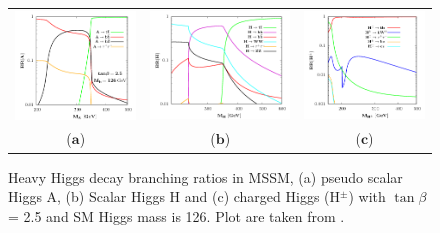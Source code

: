 \begin{figure}[htp]
\centering
\begin{tabular}{ccc}
\hspace{-0.7cm}
\includegraphics[scale=0.47]{fig/chapt2/A_br.png}
& \hspace{-0.65cm} \includegraphics[scale=0.47]{fig/chapt2/H_br.png}
& \hspace{-0.65cm} \includegraphics[scale=0.47]{fig/chapt2/H_pm_br.png}\\
  \qquad ($\mathbf{a}$)\qquad\qquad&($\mathbf{b}$)\qquad\qquad&($\mathbf{c}$)\\
\end{tabular}
\caption{Heavy Higgs decay branching ratios in MSSM, (a) pseudo scalar Higgs A, (b) Scalar Higgs H and (c) charged Higgs (H$^{\pm}$) with $\tan\beta$ = 2.5 and SM Higgs mass is 126. Plot are taken from \cite{Djouadi:2013vqa}. }\label{fig:Heavy_Hpm_BR}
\end{figure}
